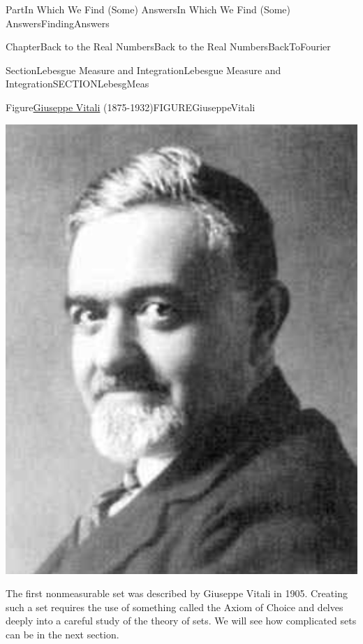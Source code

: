 \documentclass[oneside,10pt,]{book}
\numberwithin{equation}{part}
\begin{document}
\begin{partptx}{Part}{In Which We Find (Some) Answers}{}{In Which We Find (Some) Answers}{}{}{FindingAnswers}
\begin{chapterptx}{Chapter}{Back to the Real Numbers}{}{Back to the Real Numbers}{}{}{BackToFourier}
\begin{sectionptx}{Section}{Lebesgue Measure and Integration}{}{Lebesgue Measure and Integration}{}{}{SECTIONLebesgMeas}
\begin{figureptx}{Figure}{\href{https://mathshistory.st-andrews.ac.uk/Biographies/Vitali/}{Giuseppe Vitali}\protect\footnotemark{} (1875-1932)}{FIGUREGiuseppeVitali}{}%
\begin{image}{0.3}{0.4}{0.3}{}%
\includegraphics[width=\linewidth]{external/images/Vitali.png}
\end{image}%
\tcblower
\end{figureptx}%
%
The first non\textendash{}measurable set was described by Giuseppe Vitali  in 1905.  Creating such a set requires the use of something called the Axiom of Choice and delves deeply into a careful study of the theory of sets.  We will see how complicated sets can be in the next section.%
\end{sectionptx}
%
%
\typeout{************************************************}
\typeout{************************************************}

\end{chapterptx}
\end{partptx}
\end{document}
